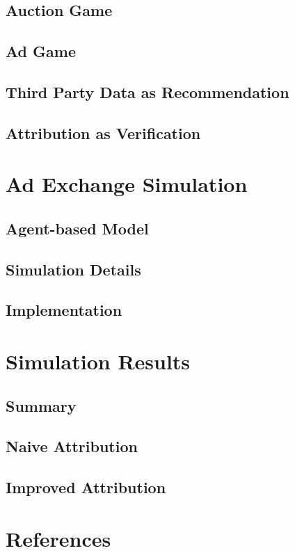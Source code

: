 \documentclass{article}
\begin{document}
\subsection{Auction Game}

\subsection{Ad Game}

\subsection{Third Party Data as Recommendation}

\subsection{Attribution as Verification}

\newpage

\section{Ad Exchange Simulation}

\subsection{Agent-based Model}

\subsection{Simulation Details}

\subsection{Implementation}

\newpage

\section{Simulation Results}

\subsection{Summary}

\subsection{Naive Attribution}

\subsection{Improved Attribution}

\section{References}



\end{document}
